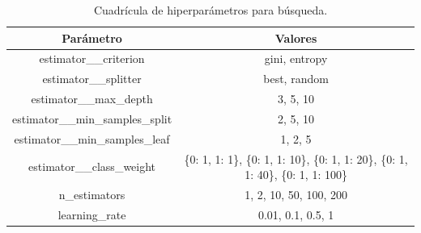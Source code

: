 \documentclass[12pt,letterpaper]{article}
\begin{document}
\begin{table}[H]
\centering
\begin{tabular}{|c|c|}
\hline
\textbf{Parámetro} & \textbf{Valores} \\ \hline
estimator\_\_criterion & gini, entropy \\ \hline
estimator\_\_splitter & best, random \\ \hline
estimator\_\_max\_depth & 3, 5, 10 \\ \hline
estimator\_\_min\_samples\_split & 2, 5, 10 \\ \hline
estimator\_\_min\_samples\_leaf & 1, 2, 5 \\ \hline
estimator\_\_class\_weight & \{0: 1, 1: 1\}, \{0: 1, 1: 10\}, \{0: 1, 1: 20\}, \{0: 1, 1: 40\}, \{0: 1, 1: 100\} \\ \hline
n\_estimators & 1, 2, 10, 50, 100, 200 \\ \hline
learning\_rate & 0.01, 0.1, 0.5, 1 \\ \hline
\end{tabular}
\caption{Cuadrícula de hiperparámetros para búsqueda.}
\label{tab:grid}
\end{table}
\end{document}
